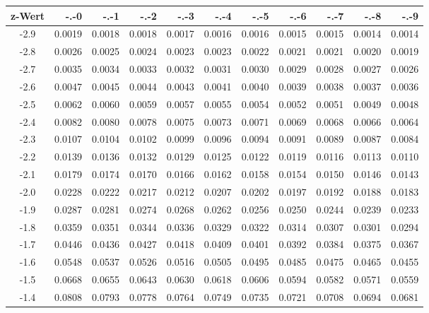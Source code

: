 \documentclass[11pt,a4paper]{article}
\begin{document}
\begin{table}[h]
	\centering
	\begin{tabular}{|c||r|r|r|r|r|r|r|r|r|r|}
		\hline
		z-Wert & -.-0 & -.-1 & -.-2 & -.-3 & -.-4 & -.-5 & -.-6 & -.-7 & -.-8 & -.-9 \\
		\hline
		\hline
		-2.9	& 0.0019	& 0.0018	& 0.0018	& 0.0017	& 0.0016	& 0.0016	& 0.0015	& 0.0015	& 0.0014	& 0.0014 \\
		\hline
		-2.8	& 0.0026	& 0.0025	& 0.0024	& 0.0023	& 0.0023	& 0.0022	& 0.0021	& 0.0021	& 0.0020	& 0.0019 \\
		\hline
		-2.7	& 0.0035	& 0.0034	& 0.0033	& 0.0032	& 0.0031	& 0.0030	& 0.0029	& 0.0028	& 0.0027	& 0.0026\\
		\hline
		-2.6	& 0.0047	& 0.0045	& 0.0044	& 0.0043	& 0.0041	& 0.0040	& 0.0039	& 0.0038	& 0.0037	& 0.0036\\
		\hline
		-2.5	& 0.0062	& 0.0060	& 0.0059	& 0.0057	& 0.0055	& 0.0054	& 0.0052	& 0.0051	& 0.0049	& 0.0048\\
		\hline
		-2.4	& 0.0082	& 0.0080	& 0.0078	& 0.0075	& 0.0073	& 0.0071	& 0.0069	& 0.0068	& 0.0066	& 0.0064\\
		\hline
		-2.3	& 0.0107	& 0.0104	& 0.0102	& 0.0099	& 0.0096	& 0.0094	& 0.0091	& 0.0089	& 0.0087	& 0.0084\\
		\hline
		-2.2	& 0.0139	& 0.0136	& 0.0132	& 0.0129	& 0.0125	& 0.0122	& 0.0119	& 0.0116	& 0.0113	& 0.0110\\
		\hline
		-2.1	& 0.0179	& 0.0174	& 0.0170	& 0.0166	& 0.0162	& 0.0158	& 0.0154	& 0.0150	& 0.0146	& 0.0143\\
		\hline
		-2.0	& 0.0228	& 0.0222	& 0.0217	& 0.0212	& 0.0207	& 0.0202	& 0.0197	& 0.0192	& 0.0188	& 0.0183\\
		\hline
		-1.9	& 0.0287	& 0.0281	& 0.0274	& 0.0268	& 0.0262	& 0.0256	& 0.0250	& 0.0244	& 0.0239	& 0.0233\\
		\hline
		-1.8	& 0.0359	& 0.0351	& 0.0344	& 0.0336	& 0.0329	& 0.0322	& 0.0314	& 0.0307	& 0.0301	& 0.0294\\
		\hline
		-1.7	& 0.0446	& 0.0436	& 0.0427	& 0.0418	& 0.0409	& 0.0401	& 0.0392	& 0.0384	& 0.0375	& 0.0367\\
		\hline
		-1.6	& 0.0548	& 0.0537	& 0.0526	& 0.0516	& 0.0505	& 0.0495	& 0.0485	& 0.0475	& 0.0465	& 0.0455\\
		\hline
		-1.5	& 0.0668	& 0.0655	& 0.0643	& 0.0630	& 0.0618	& 0.0606	& 0.0594	& 0.0582	& 0.0571	& 0.0559\\
		\hline
		-1.4	& 0.0808	& 0.0793	& 0.0778	& 0.0764	& 0.0749	& 0.0735	& 0.0721	& 0.0708	& 0.0694	& 0.0681\\

\end{tabular}
\end{table}
\end{document}
